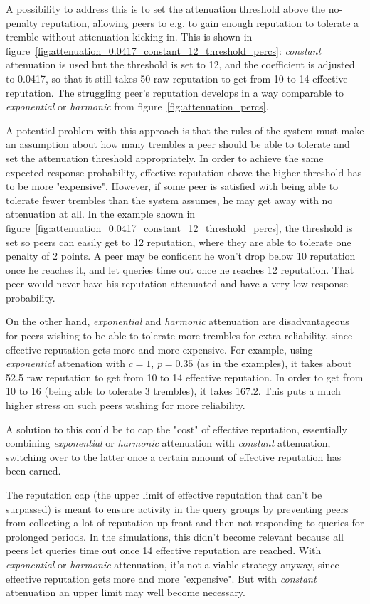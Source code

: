 A possibility to address this is to set the attenuation threshold above the
no-penalty reputation, allowing peers to e.g. to gain enough reputation to
tolerate a tremble without attenuation kicking in. This is shown in
figure~\ref{fig:attenuation_0.0417_constant_12_threshold_percs}: \emph{constant}
attenuation is used but the threshold is set to 12, and the coefficient is
adjusted to 0.0417, so that it still takes 50 raw reputation to get from 10 to
14 effective reputation. The struggling peer's reputation develops in a way
comparable to \emph{exponential} or \emph{harmonic} from
figure~\ref{fig:attenuation_percs}.

A potential problem with this approach is that the rules of the system must make
an assumption about how many trembles a peer should be able to tolerate and set
the attenuation threshold appropriately. In order to achieve the same expected
response probability, effective reputation above the higher threshold has to be
more "expensive". However, if some peer is satisfied with being able to tolerate
fewer trembles than the system assumes, he may get away with no attenuation at
all. In the example shown in
figure~\ref{fig:attenuation_0.0417_constant_12_threshold_percs}, the threshold
is set so peers can easily get to 12 reputation, where they are able to tolerate
one penalty of 2 points. A peer may be confident he won't drop below 10
reputation once he reaches it, and let queries time out once he reaches 12
reputation. That peer would never have his reputation attenuated and have a very
low response probability.

On the other hand, \emph{exponential} and \emph{harmonic} attenuation are
disadvantageous for peers wishing to be able to tolerate more trembles for extra
reliability, since effective reputation gets more and more expensive. For
example, using \emph{exponential} attenation with $c = 1$, $p = 0.35$ (as in the
examples), it takes about 52.5 raw reputation to get from 10 to 14 effective
reputation. In order to get from 10 to 16 (being able to tolerate 3 trembles),
it takes 167.2. This puts a much higher stress on such peers wishing for more
reliability.

A solution to this could be to cap the "cost" of effective reputation,
essentially combining \emph{exponential} or \emph{harmonic} attenuation with
\emph{constant} attenuation, switching over to the latter once a certain amount
of effective reputation has been earned.

The reputation cap (the upper limit of effective reputation that can't be
surpassed) is meant to ensure activity in the query groups by preventing peers
from collecting a lot of reputation up front and then not responding to queries
for prolonged periods. In the simulations, this didn't become relevant because
all peers let queries time out once 14 effective reputation are reached.  With
\emph{exponential} or \emph{harmonic} attenuation, it's not a viable strategy
anyway, since effective reputation gets more and more "expensive". But with
\emph{constant} attenuation an upper limit may well become necessary.

